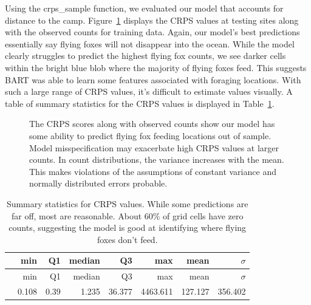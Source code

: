 \documentclass[
  12pt,
  letterpaper,
  DIV=11,
  numbers=noendperiod]{scrartcl}
\begin{document}
Using the crps\_sample function, we evaluated our model that accounts
for distance to the camp. Figure~\ref{fig-final_crps} displays the CRPS
values at testing sites along with the observed counts for training
data. Again, our model's best predictions essentially say flying foxes
will not disappear into the ocean. While the model clearly struggles to
predict the highest flying fox counts, we see darker cells within the
bright blue blob where the majority of flying foxes feed. This suggests
BART was able to learn some features associated with foraging locations.
With such a large range of CRPS values, it's difficult to estimate
values visually. A table of summary statistics for the CRPS values is
displayed in Table~\ref{tbl-crps_summary}.

\begin{figure}[H]


\caption{\label{fig-final_crps}The CRPS scores along with observed
counts show our model has some ability to predict flying fox feeding
locations out of sample. Model misspecification may exacerbate high CRPS
values at larger counts. In count distributions, the variance increases
with the mean. This makes violations of the assumptions of constant
variance and normally distributed errors probable.}

\end{figure}%

\begin{longtable}[]{@{}lrrrrrrr@{}}
\caption{Summary statistics for CRPS values. While some predictions are
far off, most are reasonable. About 60\% of grid cells have zero counts,
suggesting the model is good at identifying where flying foxes don't
feed.}\label{tbl-crps_summary}\tabularnewline
\toprule\noalign{}
& min & Q1 & median & Q3 & max & mean & \(\sigma\) \\
\midrule\noalign{}
\endfirsthead
\toprule\noalign{}
& min & Q1 & median & Q3 & max & mean & \(\sigma\) \\
\midrule\noalign{}
\endhead
\bottomrule\noalign{}
\endlastfoot
& 0.108 & 0.39 & 1.235 & 36.377 & 4463.611 & 127.127 & 356.402 \\
\end{longtable}
\end{document}

